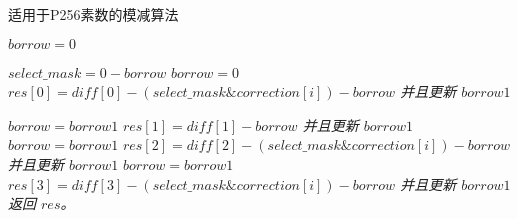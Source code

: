 \documentclass{ctexart} %
\begin{document}
\begin{algorithm}[H]
    \caption{\kaishu {} 适用于P256素数的模减算法} %
    \label{alg2}
    \LinesNumbered  %
    \emph {$borrow=0$ \;}

    \emph {$select\_mask=0-borrow$ \hspace{2em}  }
    \emph {$borrow=0$ }\;
    \emph {$res[0]=diff[0]-(select\_mask \& correction[i])-borrow$ 并且更新 $borrow1$ }\;

    \emph {$borrow=borrow1$}\;
    \emph {$res[1]=diff[1]-borrow$ 并且更新 $borrow1$ }\;
    \emph {$borrow=borrow1$}\;
    \emph {$res[2]=diff[2]-(select\_mask \& correction[i])-borrow$ 并且更新 $borrow1$ }\;
    \emph {$borrow=borrow1$}\;
    \emph {$res[3]=diff[3]-(select\_mask \& correction[i])-borrow$ 并且更新 $borrow1$ }\;
    \emph {返回 $res$。}
\end{algorithm}
\end{document}
